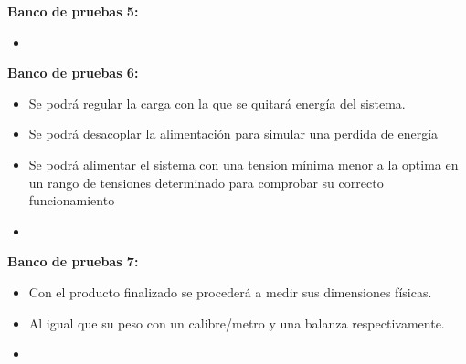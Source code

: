 \textbf{Banco de pruebas 5:}
\begin{itemize}
	\item \TBC
\end{itemize}

\textbf{Banco de pruebas 6:}
\begin{itemize}
	\item Se podrá regular la carga con la que se quitará energía del sistema.
	\item Se podrá desacoplar la alimentación para simular una perdida de energía
	\item Se podrá alimentar el sistema con una tension mínima menor a la optima en un rango de tensiones determinado para comprobar su correcto funcionamiento
	\item \TBC
\end{itemize}

\textbf{Banco de pruebas 7:}
\begin{itemize}
	\item Con el producto finalizado se procederá a medir sus dimensiones físicas.
	\item Al igual que su peso con un calibre/metro y una balanza respectivamente.
	\item \TBC
\end{itemize}